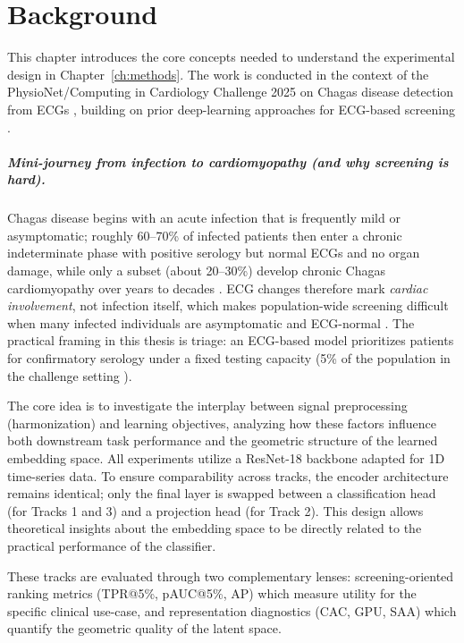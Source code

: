 \chapter{Background}
\label{ch:background}

This chapter introduces the core concepts needed to understand the experimental design in Chapter~\ref{ch:methods}.
The work is conducted in the context of the PhysioNet/Computing in Cardiology Challenge 2025 on Chagas disease detection from ECGs \parencite{2025ChallengePreprint,2025ChallengeCinC}, building on prior deep-learning approaches for ECG-based screening \parencite{jidling_screening_2023}.

\paragraph{Mini-journey from infection to cardiomyopathy (and why screening is hard).}
Chagas disease begins with an acute infection that is frequently mild or asymptomatic; roughly 60--70\% of infected patients then enter a chronic indeterminate phase with positive serology but normal ECGs and no organ damage, while only a subset (about 20--30\%) develop chronic Chagas cardiomyopathy over years to decades \parencite{chagas_progression_2022,chagas_review_lancet_2024}.
ECG changes therefore mark \emph{cardiac involvement}, not infection itself, which makes population-wide screening difficult when many infected individuals are asymptomatic and ECG-normal \parencite{chagas_ecg_abnormalities_2018}.
The practical framing in this thesis is triage: an ECG-based model prioritizes patients for confirmatory serology under a fixed testing capacity (5\% of the population in the challenge setting \parencite{2025ChallengeCinC}).

The core idea is to investigate the interplay between signal preprocessing (harmonization) and learning objectives, analyzing how these factors influence both downstream task performance and the geometric structure of the learned embedding space.
All experiments utilize a ResNet-18 backbone adapted for 1D time-series data.
To ensure comparability across tracks, the encoder architecture remains identical; only the final layer is swapped between a classification head (for Tracks 1 and 3) and a projection head (for Track 2).
This design allows theoretical insights about the embedding space to be directly related to the practical performance of the classifier.

These tracks are evaluated through two complementary lenses: screening-oriented ranking metrics (TPR@5\%, pAUC@5\%, AP) which measure utility for the specific clinical use-case, and representation diagnostics (CAC, GPU, SAA) which quantify the geometric quality of the latent space.

